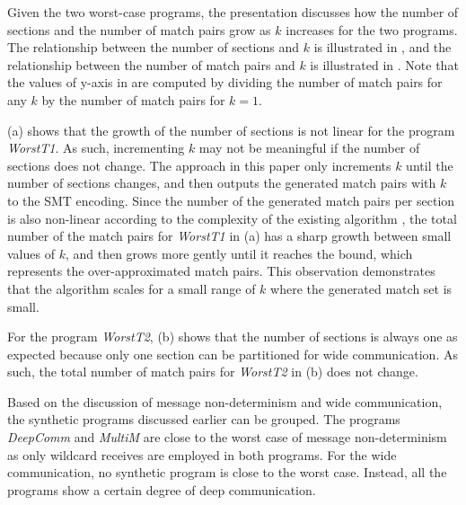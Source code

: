 Given the two worst-case programs, the presentation discusses how the number of sections and the number of match pairs grow as $k$ increases for the two programs. 
The relationship between the number of sections and $k$ is illustrated in , and the relationship between the number of match pairs and $k$ is illustrated in .
Note that the values of y-axis in  are computed by dividing the number of match pairs for any $k$ by the number of match pairs for $k=1$.

 (a) shows that the growth of the number of sections is not linear for the program \textit{WorstT1}. As such, incrementing $k$ may not be meaningful if the number of sections does not change. The approach in this paper only increments $k$ until the number of sections changes, and then outputs the generated match pairs with $k$ to the SMT encoding.
Since the number of the generated match pairs per section is also non-linear according to the complexity of the existing algorithm \cite{DBLP:conf/kbse/HuangMM13}, the total number of the match pairs for \textit{WorstT1} in  (a) has a sharp growth between small values of $k$, and then grows more gently until it reaches the bound, which represents the over-approximated match pairs. This observation demonstrates that the algorithm scales for a small range of $k$ where the generated match set is small.


For the program \textit{WorstT2},  (b) shows that the number of sections is always one as expected because only one section can be partitioned for wide communication. 
As such, the total number of match pairs for \textit{WorstT2} in  (b) does not change. 

Based on the discussion of message non-determinism and wide communication, the synthetic programs discussed earlier can be grouped. The programs \textit{DeepComm} and \textit{MultiM} are close to the worst case of message non-determinism as only wildcard receives are employed in both programs. For the wide communication, no synthetic program is close to the worst case. Instead, all the programs show a certain degree of deep communication. 

